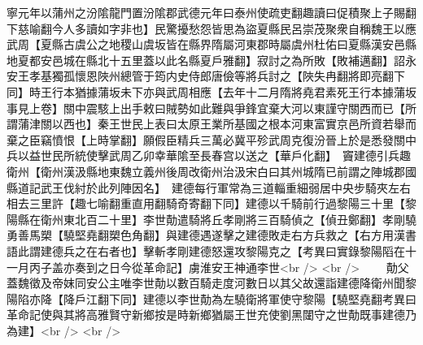 寧元年以蒲州之汾隂龍門置汾隂郡武德元年曰泰州使疏吏翻趣讀曰促積聚上子賜翻下慈喻翻今人多讀如字非也】民驚擾愁怨皆思為盜夏縣民呂崇茂聚衆自稱魏王以應武周【夏縣古虞公之地稷山虞坂皆在縣界隋屬河東郡時屬虞州杜佑曰夏縣漢安邑縣地夏都安邑城在縣北十五里蓋以此名縣夏戶雅翻】寂討之為所敗【敗補邁翻】詔永安王孝基獨孤懷恩陜州總管于筠内史侍郎唐儉等將兵討之【陜失冉翻將即亮翻下同】時王行本猶據蒲坂未下亦與武周相應【去年十二月隋將堯君素死王行本據蒲坂事見上卷】關中震駭上出手敕曰賊勢如此難與爭鋒宜棄大河以東謹守關西而已【所謂蒲津關以西也】秦王世民上表曰太原王業所基國之根本河東富實京邑所資若舉而棄之臣竊憤恨【上時掌翻】願假臣精兵三萬必冀平殄武周克復汾晉上於是悉發關中兵以益世民所統使擊武周乙卯幸華隂至長春宫以送之【華戶化翻】　竇建德引兵趣衛州【衛州漢汲縣地東魏立義州後周改衛州治汲宋白曰其州城隋已前謂之陣城郡國縣道記武王伐紂於此列陣因名】　建德每行軍常為三道輜重細弱居中央步騎夾左右相去三里許【趣七喻翻重直用翻騎奇寄翻下同】建德以千騎前行過黎陽三十里【黎陽縣在衛州東北百二十里】李世勣遣騎將丘孝剛將三百騎偵之【偵丑鄭翻】孝剛驍勇善馬槊【驍堅堯翻槊色角翻】與建德遇遂擊之建德敗走右方兵救之【右方用漢書語此謂建德兵之在右者也】擊斬孝剛建德怒還攻黎陽克之【考異曰實錄黎陽䧟在十一月丙子盖亦奏到之日今從革命記】虜淮安王神通李世<br />
<br />
　　勣父蓋魏徵及帝妺同安公主唯李世勣以數百騎走度河數日以其父故還詣建德降衛州聞黎陽陷亦降【降戶江翻下同】建德以李世勣為左驍衛將軍使守黎陽【驍堅堯翻考異曰革命記使與其將高雅賢守新鄉按是時新鄉猶屬王世充使劉黑闥守之世勣既事建德乃為建】<br />
<br />
